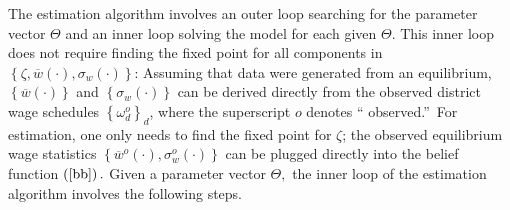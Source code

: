 \documentclass[notitlepage,12pt]{article}%
\begin{document}
The estimation algorithm involves an outer loop searching for the parameter
vector $\Theta$ and an inner loop solving the model for each given $\Theta$.
This inner loop does not require finding the fixed point for all components in
$\left\{  \zeta,\overline{w}\left(  \cdot\right)  ,\sigma_{w}\left(
\cdot\right)  \right\}  $: Assuming that data were generated from an
equilibrium, $\left\{  \overline{w}\left(  \cdot\right)  \right\}  $ and
$\left\{  \sigma_{w}\left(  \cdot\right)  \right\}  $ can be derived directly
from the observed district wage schedules $\left\{  \omega_{d}^{o}\right\}
_{d}$, where the superscript $o$ denotes \textquotedblleft
observed.\textquotedblright\ For estimation, one only needs to find the fixed
point for $\zeta$; the observed equilibrium wage statistics $\left\{
\overline{w}^{o}\left(  \cdot\right)  ,\sigma_{w}^{o}\left(  \cdot\right)
\right\}  $ can be plugged directly into the belief function $\left(
\ref{bb}\right)  .$ Given a parameter vector $\Theta,$ the inner loop of the
estimation algorithm involves the following steps.
\end{document}
